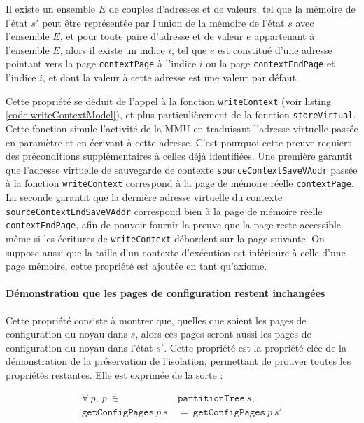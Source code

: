 			\begin{theorem}
				Il existe un ensemble $E$ de couples d'adresses et de valeurs, tel que la mémoire de l'état $s'$ peut être représentée par l'union de la mémoire de l'état $s$ avec l'ensemble $E$, et pour toute paire d'adresse et de valeur $e$ appartenant à l'ensemble $E$, alors il existe un indice $i$, tel que $e$ est constitué d'une adresse pointant vers la page \texttt{contextPage} à l'indice $i$ ou la page \texttt{contextEndPage} et l'indice $i$, et dont la valeur à cette adresse est une valeur par défaut.
			\label{prop:s'redef}
			\end{theorem}

			Cette propriété se déduit de l'appel à la fonction \texttt{writeContext} (voir listing \ref{code:writeContextModel}), et plus particulièrement de la fonction \texttt{storeVirtual}. Cette fonction simule l'activité de la MMU en traduisant l'adresse virtuelle passée en paramètre et en écrivant à cette adresse. C'est pourquoi cette preuve requiert des préconditions supplémentaires à celles déjà identifiées. Une première garantit que l'adresse virtuelle de sauvegarde de contexte \texttt{sourceContextSaveVAddr} passée à la fonction \texttt{writeContext} correspond à la page de mémoire réelle \texttt{contextPage}. La seconde garantit que la dernière adresse virtuelle du contexte \texttt{sourceContextEndSaveVAddr} correspond bien à la page de mémoire réelle \texttt{contextEndPage}, afin de pouvoir fournir la preuve que la page reste accessible même si les écritures de \texttt{writeContext} débordent sur la page suivante. On suppose aussi que la taille d'un contexte d'exécution est inférieure à celle d'une page mémoire, cette propriété est ajoutée en tant qu'axiome.

			\paragraph{Démonstration que les pages de configuration restent inchangées}

			Cette propriété consiste à montrer que, quelles que soient les pages de configuration du noyau dans $s$, alors ces pages seront aussi les pages de configuration du noyau dans l'état $s'$. Cette propriété est la propriété clée de la démonstration de la préservation de l'isolation, permettant de prouver toutes les propriétés restantes. Elle est exprimée de la sorte :

			\begin{align*}
				\forall~p,~p~\in~&\mathtt{partitionTree}~s,\\
				\mathtt{getConfigPages}~p~s~&=~\mathtt{getConfigPages}~p~s'
			\end{align*}

